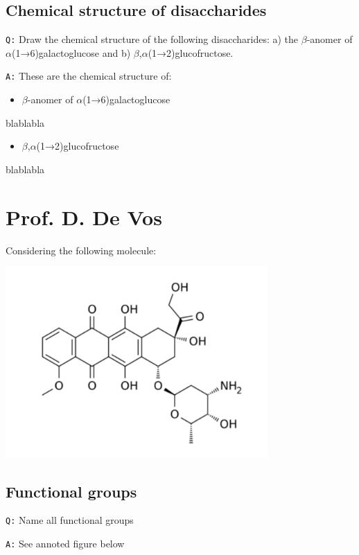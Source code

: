 \documentclass[11pt, a4paper,titlepage]{article}
\begin{document}
\subsection{Chemical structure of disaccharides}
\label{sec-2-3}

\texttt{Q:} Draw the chemical structure of the following disaccharides: a)
the $\beta$-anomer of $\alpha$(1→6)galactoglucose and b)
$\beta$,$\alpha$(1→2)glucofructose.

\texttt{A:} These are the chemical structure of:
\begin{itemize}
\item $\beta$-anomer of $\alpha$(1→6)galactoglucose
\end{itemize}

blablabla

\begin{itemize}
\item $\beta$,$\alpha$(1→2)glucofructose
\end{itemize}

blablabla
\section{Prof. D. De Vos}
\label{sec-3}

Considering the following molecule:

\includegraphics[width=10cm]{./Figures/Part3MoleculeRaw.pdf}
\subsection{Functional groups}
\label{sec-3-1}

\texttt{Q:} Name all functional groups

\texttt{A:} See annoted figure below
\end{document}

